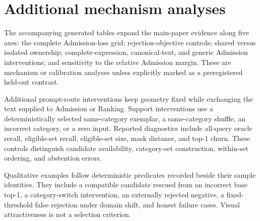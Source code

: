 \section{Additional mechanism analyses}
\label{sup:analyses}

The accompanying generated tables expand the main-paper evidence along five
axes: the complete Admission-loss grid; rejection-objective controls; shared
versus isolated ownership; complete-expression, canonical-text, and generic
Admission interventions; and sensitivity to the relative Admission margin.
These are mechanism or calibration analyses unless explicitly marked as a
preregistered held-out contrast.





















Additional prompt-route interventions keep geometry fixed while exchanging
the text supplied to Admission or Ranking.  Support interventions use a
deterministically selected same-category exemplar, a same-category shuffle,
an incorrect category, or a zero input.  Reported diagnostics include
all-query oracle recall, eligible-set recall, eligible-set size, mask distance,
and top-1 churn.  These controls distinguish candidate availability,
category-set construction, within-set ordering, and abstention errors.



Qualitative examples follow deterministic predicates recorded beside their
sample identities.  They include a compatible candidate rescued from an
incorrect base top-1, a category-switch intervention, an externally rejected
negative, a fixed-threshold false rejection under domain shift, and honest
failure cases.  Visual attractiveness is not a selection criterion.

